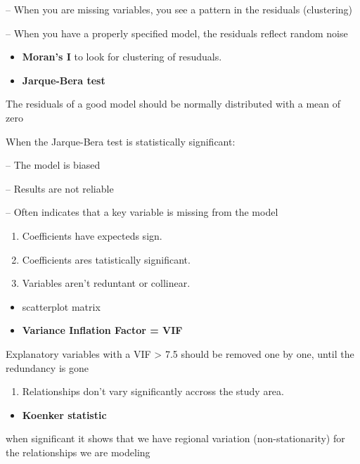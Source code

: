 \documentclass[
]{article}
\providecommand{\tightlist}{%
  \setlength{\itemsep}{0pt}\setlength{\parskip}{0pt}}
\begin{document}
-- When you are missing variables, you see a pattern in the residuals
(clustering)

-- When you have a properly specified model, the residuals reflect
random noise

\begin{itemize}
\item
  \textbf{Moran's I} to look for clustering of resuduals.
\item
  \textbf{Jarque-Bera test}
\end{itemize}

The residuals of a good model should be normally distributed with a mean
of zero

When the Jarque-Bera test is statistically significant:

-- The model is biased

-- Results are not reliable

-- Often indicates that a key variable is missing from the model

\begin{enumerate}
\def\labelenumi{\arabic{enumi}.}
\setcounter{enumi}{2}
\item
  Coefficients have expecteds sign.
\item
  Coefficients ares tatistically significant.
\item
  Variables aren't reduntant or collinear.
\end{enumerate}

\begin{itemize}
\item
  scatterplot matrix
\item
  \textbf{Variance Inflation Factor = VIF}
\end{itemize}

Explanatory variables with a VIF \textgreater{} 7.5 should be removed
one by one, until the redundancy is gone

\begin{enumerate}
\def\labelenumi{\arabic{enumi}.}
\setcounter{enumi}{5}
\tightlist
\item
  Relationships don't vary significantly accross the study area.
\end{enumerate}

\begin{itemize}
\tightlist
\item
  \textbf{Koenker statistic}
\end{itemize}

when significant it shows that we have regional variation
(non-stationarity) for the relationships we are modeling
\end{document}

